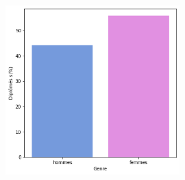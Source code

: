 \documentclass[12pt, a4paper, titlepage, table]{article}
\begin{document}
		\begin{figure}[H]
			\centering
			\includegraphics[width=0.6\textwidth]{../graphs/proportion_genre.png}
			\label{fig:genre_reponses}
		\end{figure}
	
\end{document}

